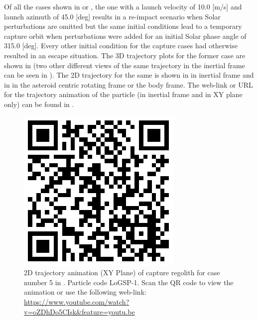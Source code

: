 Of all the cases shown in  or , the one with a launch velocity of 10.0 [m/s] and launch azimuth of 45.0 [deg] results in a re-impact scenario when Solar perturbations are omitted but the same initial conditions lead to a temporary capture orbit when perturbations were added for an initial Solar phase angle of 315.0 [deg]. Every other initial condition for the capture cases had otherwise resulted in an escape situation. The 3D trajectory plots for the former case are shown in  (two other different views of the same trajectory in the inertial frame can be seen in ). The 2D trajectory for the same is shown in  in inertial frame and in  in the asteroid centric rotating frame or the body frame. The web-link or URL for the trajectory animation of the particle (in inertial frame and in XY plane only) can be found in .
\begin{figure}[htb]
\centering
\captionsetup{justification=centering}
\includegraphics[scale=0.25]{longest_edge_perturbations/3.2Density_1cmSize/qrcode_10ms_45Azimuth_315SolarPhase.png}
\caption{2D trajectory animation (XY Plane) of capture regolith for case number 5 in . Particle code LoGSP-1. Scan the QR code to view the animation or use the following web-link: \url{https://www.youtube.com/watch?v=oZDhDo5CIsk&feature=youtu.be}}
\label{fig:LoGSP_1_capture_case_5_2d_trajectory_animation}
\end{figure}
\FloatBarrier
